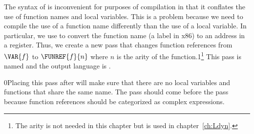 \documentclass[7x10]{TimesAPriori_MIT}%
\newcommand{\gray}[1]{{\color{gray} #1}}
\def\racketEd{0}
\def\pythonEd{1}
\def\edition{0}
\newcommand{\racket}[1]{{\if\edition\racketEd{#1}\fi}}
\newcommand{\python}[1]{{\if\edition\pythonEd #1\fi}}
\numberwithin{theorem}{chapter}
\numberwithin{definition}{chapter}
\numberwithin{equation}{chapter}
\begin{document}
The syntax of \LangFun{} is inconvenient for purposes of compilation
in that it conflates the use of function names and local
variables. This is a problem because we need to compile the use of a
function name differently than the use of a local variable.  In
particular, we use  to convert the function name (a label
in x86) to an address in a register.  Thus, we create a new pass that
changes function references from $\VAR{f}$ to $\FUNREF{f}{n}$ where
$n$ is the arity of the function.\python{\footnote{The arity is not
    needed in this chapter but is used in chapter~\ref{ch:Ldyn}.}}
This pass is named  and the output language
is \LangFunRef{}.




\racket{Placing this pass after  will make sure that
  there are no local variables and functions that share the same
  name.}
%
The  pass should come before the
 pass because function references
should be categorized as complex expressions.
\end{document}
